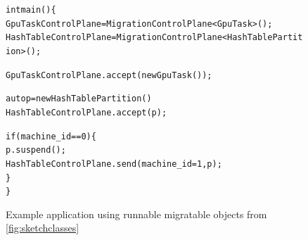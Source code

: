 \begin{figure}[t]
\begin{alltt}
int main() \{
    GpuTaskControlPlane = MigrationControlPlane<GpuTask>();
    HashTableControlPlane = MigrationControlPlane<HashTablePartition>();

    GpuTaskControlPlane.accept(new GpuTask());

    auto p = new HashTablePartition()
    HashTableControlPlane.accept(p);

    if(machine_id == 0) \{
        p.suspend();
        HashTableControlPlane.send(machine_id=1, p);
    \}
\}


\end{alltt}
\caption{
    Example application using runnable migratable objects from \autoref{fig:sketchclasses}
}
\label{fig:sketchmain}
\end{figure}



